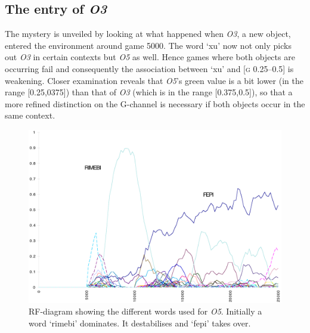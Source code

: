 \subsection{The entry of \emph{O3}}

The mystery is unveiled by looking at what
happened when \emph{O3}, a new object, entered the environment 
around game 5000. The word `xu' now not only picks out
\emph{O3} in certain contexts but \emph{O5} as well. Hence 
games where both objects are occurring fail and consequently 
the association between `xu' and [\textsc{g} 0.25–0.5] is 
weakening. Closer examination reveals that \emph{O5}'s green value
is a bit lower (in the range [0.25,0375]) than that of \emph{O3}
(which is in the range [0.375,0.5]), so that a more refined
distinction on the G-channel is necessary if both objects
occur in the same context. 


\begin{figure}[htbp]
  \centerline{\includegraphics[width=.80\textwidth]{chap7/figs/RF-O5.pdf}}
\caption{\label{RF-O5}RF-diagram showing
the different words used for \emph{O5}. Initially a word 
`rimebi' dominates. It destabilises and `fepi' takes over.}
\end{figure}

